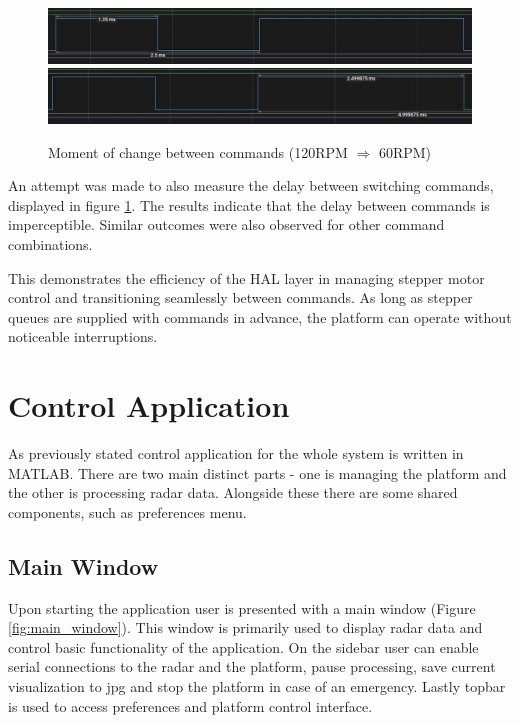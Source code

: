 \begin{figure}[h!]
  \centering
  \includegraphics[width=\textwidth]{../img/120rpm_to60_1.jpg}
  \includegraphics[width=\textwidth]{../img/120rpm_to60_2.jpg}
  \caption[Moment of change between commands with 120RPM and 60RPM]{Moment of change between commands (120RPM $\Rightarrow$  60RPM)}
  \label{fig:switching}
\end{figure}

An attempt was made to also measure the delay  between switching commands, displayed in figure \ref{fig:switching}.
The results indicate that the delay between commands is imperceptible.
Similar outcomes were also observed for other command combinations.

This demonstrates the efficiency of the HAL layer in managing stepper motor control and transitioning seamlessly between commands.
As long as stepper queues are supplied with commands in advance, the platform can operate without noticeable interruptions.



\chapter{Control Application}

As previously stated control application for the whole system is written in MATLAB.
There are two main distinct parts - one is managing the platform and the other is processing radar data.
Alongside these there are some shared components, such as preferences menu.

\section{Main Window}

Upon starting the application user is presented with a main window (Figure \ref{fig:main_window}).
This window is primarily used to display radar data and control basic functionality of the application.
On the sidebar user can enable serial connections to the radar and the platform, pause processing, save current visualization to jpg and stop the platform in case of an emergency.
Lastly topbar is used to access preferences and platform control interface.

